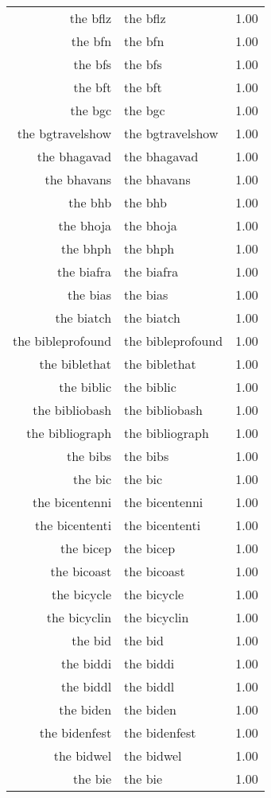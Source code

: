 \begin{table}[ht]
\begin{tabular}{rlr}
  the bflz & the bflz & 1.00 \\ 
  the bfn & the bfn & 1.00 \\ 
  the bfs & the bfs & 1.00 \\ 
  the bft & the bft & 1.00 \\ 
  the bgc & the bgc & 1.00 \\ 
  the bgtravelshow & the bgtravelshow & 1.00 \\ 
  the bhagavad & the bhagavad & 1.00 \\ 
  the bhavans & the bhavans & 1.00 \\ 
  the bhb & the bhb & 1.00 \\ 
  the bhoja & the bhoja & 1.00 \\ 
  the bhph & the bhph & 1.00 \\ 
  the biafra & the biafra & 1.00 \\ 
  the bias & the bias & 1.00 \\ 
  the biatch & the biatch & 1.00 \\ 
  the bibleprofound & the bibleprofound & 1.00 \\ 
  the biblethat & the biblethat & 1.00 \\ 
  the biblic & the biblic & 1.00 \\ 
  the bibliobash & the bibliobash & 1.00 \\ 
  the bibliograph & the bibliograph & 1.00 \\ 
  the bibs & the bibs & 1.00 \\ 
  the bic & the bic & 1.00 \\ 
  the bicentenni & the bicentenni & 1.00 \\ 
  the bicententi & the bicententi & 1.00 \\ 
  the bicep & the bicep & 1.00 \\ 
  the bicoast & the bicoast & 1.00 \\ 
  the bicycle & the bicycle & 1.00 \\ 
  the bicyclin & the bicyclin & 1.00 \\ 
  the bid & the bid & 1.00 \\ 
  the biddi & the biddi & 1.00 \\ 
  the biddl & the biddl & 1.00 \\ 
  the biden & the biden & 1.00 \\ 
  the bidenfest & the bidenfest & 1.00 \\ 
  the bidwel & the bidwel & 1.00 \\ 
  the bie & the bie & 1.00 \\ 

\end{tabular}
\end{table}
